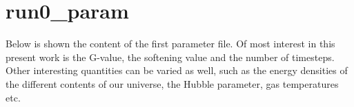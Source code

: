 \section{run0_param}

Below is shown the content of the first parameter file. Of most interest in this present work is the G-value, the softening value and the number of timesteps. Other interesting quantities can be varied as well, such as the energy densities of the different contents of our universe, the Hubble parameter, gas temperatures etc. 
\begin{cstyle}

\end{cstyle}